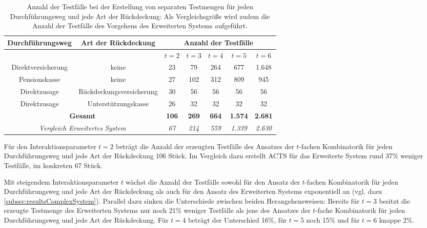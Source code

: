 \renewcommand{\arraystretch}{2}
\begin{table}[!htb]
\footnotesize
\begin{tabular}{|c|c|c|c|c|c|c|}
\hline
\cellcolor{grauinfo}Durchführungsweg   & \cellcolor{grauinfo}Art der Rückdeckung      & \multicolumn{5}{c|}{\cellcolor{grauinfo}Anzahl der Testfälle} \\ \hline
				   &                          & \textit{$t=2$}  & \textit{$t=3$}  & \textit{$t=4$ } & \textit{$t=5$} & \textit{$t=6$} \\ \hline
Direktversicherung & keine                    & 23     & 79     & 264    & 677   & 1.648  \\ \hline
Pensionskasse      & keine                    & 27     & 102    & 312    & 809   & 945   \\ \hline
Direktzusage       & Rückdeckungsversicherung & 30     & 56     & 56     & 56    & 56    \\ \hline
Direktzusage       & Unterstützungskasse      & 26     & 32     & 32     & 32    & 32    \\ \hline
\multicolumn{2}{|c|}{\textbf{Gesamt}}                    & \textbf{106}    & \textbf{269}    & \textbf{664}    & \textbf{1.574}  & \textbf{2.681}  \\ \hline \hline
\multicolumn{2}{|c|}{\scriptsize\textit{ Vergleich Erweitertes System}}                    & \scriptsize \textit{67}    & \scriptsize \textit{214}    & \scriptsize \textit{559}    & \scriptsize \textit{1.339}  & \scriptsize \textit{2.630}  \\ \hline
\end{tabular}
\caption{Anzahl der Testfälle bei der Erstellung von separaten Testmengen für jeden Durchführungsweg und jede Art der Rückdeckung: Als Vergleichsgröße wird zudem die Anzahl der Testfälle des Vorgehens des Erweiterten Systems aufgeführt.}
\label{tab:ergebnisseFullCombination}
\end{table}
\renewcommand{\arraystretch}{1.5}

Für den Interaktionsparameter $t=2$ beträgt die Anzahl der erzeugten Testfälle des Ansatzes der $t$-fachen Kombinatorik für jeden Durchführungsweg und jede Art der Rückdeckung 106 Stück. Im Vergleich dazu erstellt ACTS für das Erweiterte System rund 37\% weniger Testfälle, im konkreten 67 Stück.

Mit steigendem Interaktionsparameter $t$ wächst die Anzahl der Testfälle sowohl für den Ansatz der $t$-fachen Kombinatorik für jeden Durchführungsweg und jede Art der Rückdeckung als auch für den Ansatz des Erweiterten Systems exponentiell an (vgl. dazu \autoref{subsec:resultsComplexSystem}). Parallel dazu sinken die Unterschiede zwischen beiden Herangehensweisen: Bereits für $t=3$ besitzt die erzeugte Testmenge des Erweiterten Systems nur noch 21\% weniger Testfälle als jene des Ansatzes der $t$-fache Kombinatorik für jeden Durchführungsweg und jede Art der Rückdeckung. Für $t=4$ beträgt der Unterschied 16\%, für $t=5$ noch 15\% und für $t=6$ knappe 2\%.

